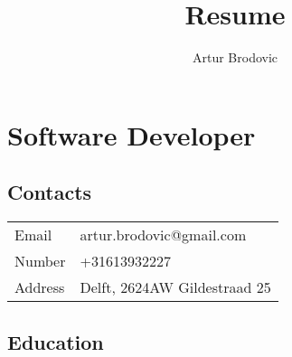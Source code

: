 \documentclass{article}
\begin{document}
\title{Resume}
\author{Artur Brodovic}
\maketitle

\section{Software Developer}

\subsection{Contacts}

\renewcommand{\arraystretch}{1.5}
\begin{tabular}{l l}
\hline
Email & artur.brodovic@gmail.com \\
Number & +31613932227 \\
Address & Delft, 2624AW Gildestraad 25 \\
\hline 
\end{tabular}

\subsection{Education}
\end{document}
